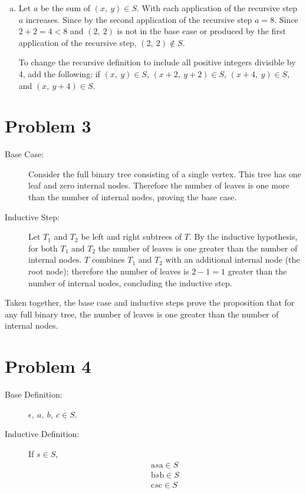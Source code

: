 \documentclass[11pt]{article}
\begin{document}
\begin{enumerate}[(a)]
\begin{description}
		\end{description}
	
		\item
		
		Let $a$ be the sum of $(x,\ y) \in S$. With each application of the
		recursive step $a$ increases. Since by the second application of the
		recursive step $a = 8$. Since $ 2 + 2 = 4 < 8 $ and $(2,\ 2)$ is not in 
		the base case or produced by the first application of the 
		recursive step,  $(2,\ 2) \notin S$.
		
		
		To change the recursive definition to include all positive integers
		divisible by 4, add the following: if $(x,\ y) \in S$, $ (x+2,\ y+2) \in 
		S$, $(x+4,\ y) \in S$, and $(x,\ y+4) \in S$.	
	
	\end{enumerate}





	
	
\section*{Problem 3}
	\begin{description}
		\item[Base Case:] Consider the full binary tree consisting of a single
		vertex. This tree has one leaf and zero internal nodes. Therefore the 
		number of leaves is one more than the number of internal nodes, proving
		the base case.
		
		\item[Inductive Step:] Let $T_1$ and $T_2$ be left and right subtrees
		of $T$. By the inductive hypothesis, for both $T_1$ and $T_2$ the number
		of leaves is one greater than the number of internal nodes. $T$ combines
		$T_1$ and $T_2$ with an additional internal node (the root node);
		therefore the number of leaves is $2-1 = 1$ greater than the number of
		internal nodes, concluding the inductive step.
	
	\end{description}
	
	
	Taken together, the base case and inductive steps prove the proposition that 
	for any full binary tree, the number of leaves is one greater than the
	number of internal nodes.

\section*{Problem 4}
	\begin{description}
	
	\item[Base Definition:] $\epsilon,\ a,\  b,\ c \in S$.
	
	\item[Inductive Definition:] If $s \in S$,
	\begin{align*}	
		\text{a}s\text{a} \in S \\
		\text{b}s\text{b} \in S \\
		\text{c}s\text{c} \in S		
	\end{align*}
	
	\end{description}
\end{document}
